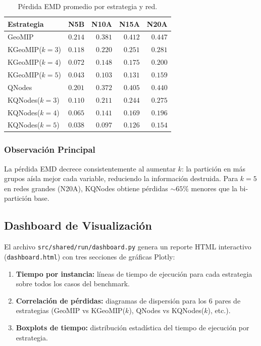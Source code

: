 \begin{table}[H]
    \centering
    \caption{Pérdida EMD promedio por estrategia y red.}
    \label{tab:losses}
    \begin{tabular}{lrrrr}
        \toprule
        \textbf{Estrategia} & \textbf{N5B} & \textbf{N10A} & \textbf{N15A} & \textbf{N20A} \\
        \midrule
        GeoMIP         & $0.214$ & $0.381$ & $0.412$ & $0.447$ \\
        KGeoMIP($k=3$) & $0.118$ & $0.220$ & $0.251$ & $0.281$ \\
        KGeoMIP($k=4$) & $0.072$ & $0.148$ & $0.175$ & $0.200$ \\
        KGeoMIP($k=5$) & $0.043$ & $0.103$ & $0.131$ & $0.159$ \\
        QNodes         & $0.201$ & $0.372$ & $0.405$ & $0.440$ \\
        KQNodes($k=3$) & $0.110$ & $0.211$ & $0.244$ & $0.275$ \\
        KQNodes($k=4$) & $0.065$ & $0.141$ & $0.169$ & $0.196$ \\
        KQNodes($k=5$) & $0.038$ & $0.097$ & $0.126$ & $0.154$ \\
        \bottomrule
    \end{tabular}
\end{table}

\subsubsection{Observación Principal}

La pérdida EMD decrece consistentemente al aumentar $k$: la partición en más grupos aísla mejor cada variable, reduciendo la información destruida. Para $k=5$ en redes grandes (N20A), KQNodes obtiene pérdidas $\sim 65\%$ menores que la bi-partición base.

\subsection{Dashboard de Visualización}

El archivo \texttt{src/shared/run/dashboard.py} genera un reporte HTML interactivo (\texttt{dashboard.html}) con tres secciones de gráficas Plotly:

\begin{enumerate}[label=\textbf{\arabic*.}]
    \item \textbf{Tiempo por instancia:} líneas de tiempo de ejecución para cada estrategia sobre todos los casos del benchmark.
    \item \textbf{Correlación de pérdidas:} diagramas de dispersión para los 6 pares de estrategias (GeoMIP vs KGeoMIP($k$), QNodes vs KQNodes($k$), etc.).
    \item \textbf{Boxplots de tiempo:} distribución estadística del tiempo de ejecución por estrategia.
\end{enumerate}

